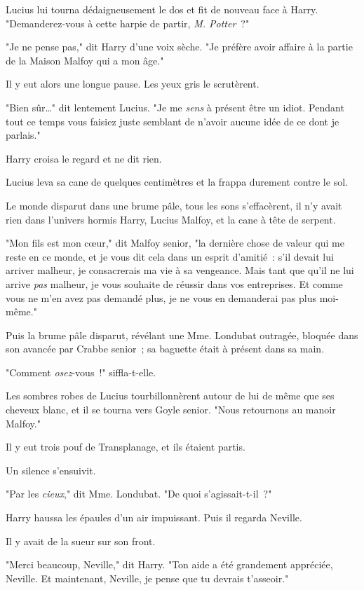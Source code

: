 Lucius lui tourna dédaigneusement le dos et fit de nouveau face à Harry. "Demanderez-vous à cette harpie de partir, \emph{M. Potter}~?"

"Je ne pense pas," dit Harry d'une voix sèche. "Je préfère avoir affaire à la partie de la Maison Malfoy qui a mon âge."

Il y eut alors une longue pause. Les yeux gris le scrutèrent.

"Bien sûr…" dit lentement Lucius. "Je me \emph{sens} à présent être un idiot. Pendant tout ce temps vous faisiez juste semblant de n'avoir aucune idée de ce dont je parlais."

Harry croisa le regard et ne dit rien.

Lucius leva sa cane de quelques centimètres et la frappa durement contre le sol.

Le monde disparut dans une brume pâle, tous les sons s'effacèrent, il n'y avait rien dans l'univers hormis Harry, Lucius Malfoy, et la cane à tête de serpent.

"Mon fils est mon cœur," dit Malfoy senior, "la dernière chose de valeur qui me reste en ce monde, et je vous dit cela dans un esprit d'amitié~: s'il devait lui arriver malheur, je consacrerais ma vie à sa vengeance. Mais tant que qu'il ne lui arrive \emph{pas} malheur, je vous souhaite de réussir dans vos entreprises. Et comme vous ne m'en avez pas demandé plus, je ne vous en demanderai pas plus moi-même."

Puis la brume pâle disparut, révélant une Mme. Londubat outragée, bloquée dans son avancée par Crabbe senior~; sa baguette était à présent dans sa main.

"Comment \emph{osez}-vous~!" siffla-t-elle.

Les sombres robes de Lucius tourbillonnèrent autour de lui de même que ses cheveux blanc, et il se tourna vers Goyle senior. "Nous retournons au manoir Malfoy."

Il y eut trois pouf de Transplanage, et ils étaient partis.

Un silence s'ensuivit.

"Par les \emph{cieux}," dit Mme. Londubat. "De quoi s'agissait-t-il~?"

Harry haussa les épaules d'un air impuissant. Puis il regarda Neville.

Il y avait de la sueur sur son front.

"Merci beaucoup, Neville," dit Harry. "Ton aide a été grandement appréciée, Neville. Et maintenant, Neville, je pense que tu devrais t'asseoir."


